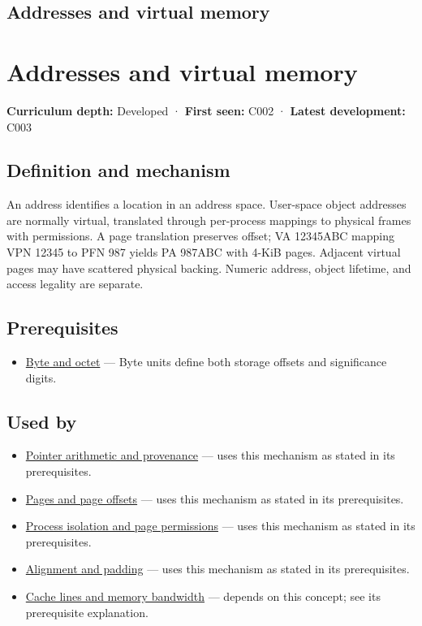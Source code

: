 \hypertarget{appendix-18ee4f913c3c}{}
\section*{Addresses and virtual memory}
\chapter{Addresses and virtual memory}\label{appendix-18ee4f913c3c-addresses-and-virtual-memory}

\textbf{Curriculum depth:} Developed · \textbf{First seen:} C002 · \textbf{Latest development:} C003

\section{Definition and mechanism}\label{appendix-18ee4f913c3c-definition-and-mechanism}

An address identifies a location in an address space. User-space object addresses are normally virtual, translated through per-process mappings to physical frames with permissions. A page translation preserves offset; VA 12345ABC mapping VPN 12345 to PFN 987 yields PA 987ABC with 4-KiB pages. Adjacent virtual pages may have scattered physical backing. Numeric address, object lifetime, and access legality are separate.

\section{Prerequisites}\label{appendix-18ee4f913c3c-prerequisites}

\begin{itemize}
\tightlist
\item
  \hyperref[appendix-5bee2df85484]{Byte and octet} --- Byte units define both storage offsets and significance digits.
\end{itemize}

\section{Used by}\label{appendix-18ee4f913c3c-used-by}

\begin{itemize}
\item
  \hyperref[appendix-6af5921bc853]{Pointer arithmetic and provenance} --- uses this mechanism as stated in its prerequisites.
\item
  \hyperref[appendix-0c67cd5bf30a]{Pages and page offsets} --- uses this mechanism as stated in its prerequisites.
\item
  \hyperref[appendix-c2a9ad1e2b49]{Process isolation and page permissions} --- uses this mechanism as stated in its prerequisites.
\item
  \hyperref[appendix-a1f7c53b4742]{Alignment and padding} --- uses this mechanism as stated in its prerequisites.
\item
  \hyperref[appendix-e4ccdbab8320]{Cache lines and memory bandwidth} --- depends on this concept; see its prerequisite explanation.
\end{itemize}


